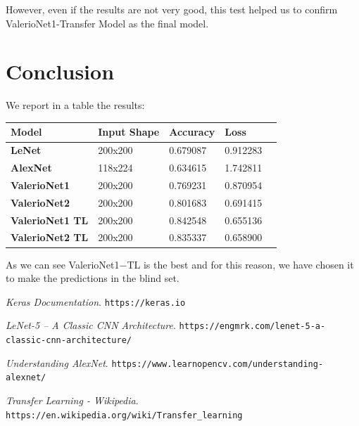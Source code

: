 \documentclass[12pt]{article}
\begin{document}
However, even if the results are not very good, this test helped us to confirm ValerioNet1-Transfer Model as the final model.

\newpage
\section{Conclusion}

We report in a table the results:

\bigskip
\begin{tabular}{ | l | l | l | l | l | }
 \hline
 \textbf{Model} & \textbf{Input Shape} & \textbf{Accuracy} & \textbf{Loss} \\ \hline
 \textbf{LeNet} & 200x200 & 0.679087 & 0.912283 \\ \hline
 \textbf{AlexNet} & 118x224 & 0.634615 & 1.742811 \\ \hline
 \textbf{ValerioNet1} & 200x200 & 0.769231 & 0.870954 \\ \hline
 \textbf{ValerioNet2} & 200x200 & 0.801683 & 0.691415 \\ \hline
 \textbf{ValerioNet1 TL} & 200x200 & 0.842548 & 0.655136 \\ \hline
 \textbf{ValerioNet2 TL} & 200x200 & 0.835337 & 0.658900 \\ \hline
\end{tabular}
\bigskip

As we can see ValerioNet1$-$TL is the best and for this reason, we have chosen it to make the predictions in the blind set.
\vfill

\begin{thebibliography}{99}

{\em Keras Documentation}.\newline
 \verb|https://keras.io|

{\em LeNet-5 – A Classic CNN Architecture}.\newline
 \verb|https://engmrk.com/lenet-5-a-classic-cnn-architecture/|

{\em Understanding AlexNet}.\newline
 \verb|https://www.learnopencv.com/understanding-alexnet/|

{\em Transfer Learning - Wikipedia}.\newline
 \verb|https://en.wikipedia.org/wiki/Transfer_learning|

\end{thebibliography}
\end{document}

